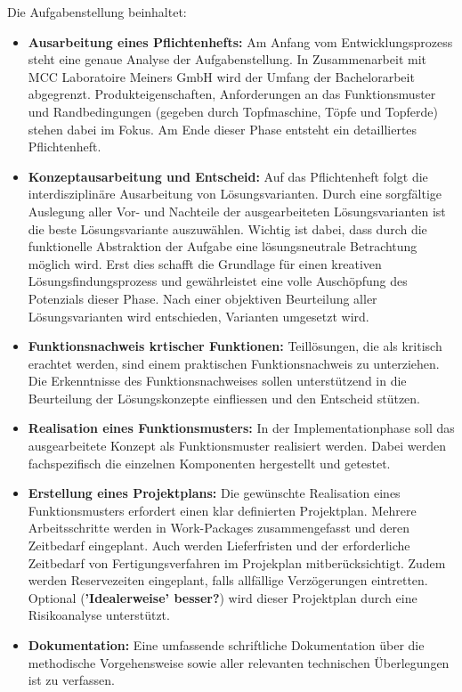Die Aufgabenstellung beinhaltet:
\begin{itemize}
	\item \textbf{Ausarbeitung eines Pflichtenhefts:} Am Anfang vom Entwicklungsprozess steht eine genaue Analyse der Aufgabenstellung. In Zusammenarbeit mit MCC Laboratoire Meiners GmbH wird der Umfang der Bachelorarbeit abgegrenzt. Produkteigenschaften, Anforderungen an das Funktionsmuster und Randbedingungen (gegeben durch Topfmaschine, Töpfe und Topferde) stehen dabei im Fokus. Am Ende dieser Phase entsteht ein detailliertes Pflichtenheft.
	 
	\item \textbf{Konzeptausarbeitung und Entscheid:} Auf das Pflichtenheft folgt die interdisziplinäre Ausarbeitung von Lösungsvarianten. Durch eine sorgfältige Auslegung aller Vor- und Nachteile der ausgearbeiteten Lösungsvarianten ist die beste Lösungsvariante auszuwählen. Wichtig ist dabei, dass durch die funktionelle Abstraktion der Aufgabe eine lösungsneutrale Betrachtung möglich wird. Erst dies schafft die Grundlage für einen kreativen Lösungsfindungsprozess und gewährleistet eine volle Auschöpfung des Potenzials dieser Phase. Nach einer objektiven Beurteilung aller Lösungsvarianten wird entschieden, Varianten umgesetzt wird.
	
	\item \textbf{Funktionsnachweis krtischer Funktionen:} Teillösungen, die als kritisch erachtet werden, sind einem praktischen Funktionsnachweis zu unterziehen. Die Erkenntnisse des Funktionsnachweises sollen unterstützend in die Beurteilung der Lösungskonzepte einfliessen und den Entscheid stützen.
	
	\item \textbf{Realisation eines Funktionsmusters:} In der Implementationphase soll das ausgearbeitete Konzept als Funktionsmuster realisiert werden. Dabei werden fachspezifisch die einzelnen Komponenten hergestellt und getestet. 
	
	\item \textbf{Erstellung eines Projektplans:} Die gewünschte Realisation eines Funktionsmusters erfordert einen klar definierten Projektplan. Mehrere Arbeitsschritte werden in Work-Packages zusammengefasst und deren Zeitbedarf eingeplant. Auch  werden Lieferfristen und der erforderliche Zeitbedarf von Fertigungsverfahren im Projekplan mitberücksichtigt. Zudem werden Reservezeiten eingeplant, falls allfällige Verzögerungen eintretten. Optional (\textbf{'Idealerweise' besser?}) wird dieser Projektplan durch eine Risikoanalyse unterstützt.
	
	\item \textbf{Dokumentation:} Eine umfassende schriftliche Dokumentation über die methodische Vorgehensweise sowie aller relevanten technischen Überlegungen ist zu verfassen. 
	
\end{itemize}